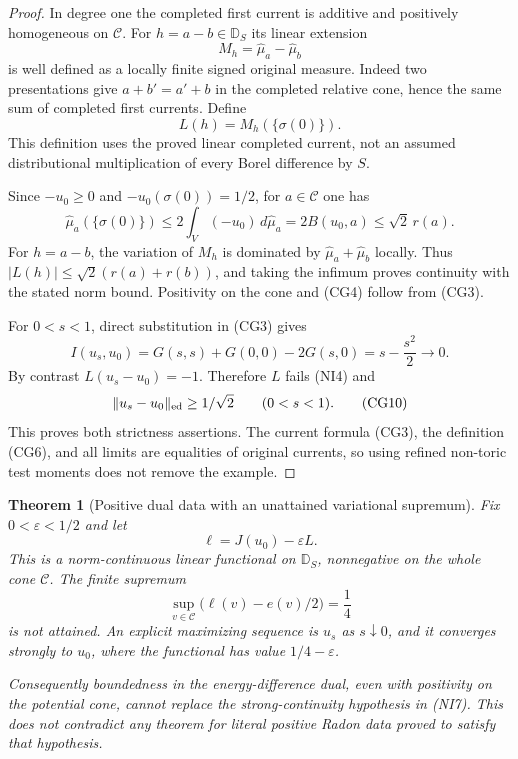 \documentclass[11pt,a4paper]{article}
\numberwithin{equation}{section}
\newtheorem{theorem}{Theorem}[section]
\theoremstyle{definition}
\theoremstyle{remark}
\begin{document}
\begin{proof}
In degree one the completed first current is additive and
positively homogeneous on $\mathscr C$. For $h=a-b\in\mathbb D_S$
its linear extension
\[
                    M_h=\widehat\mu_a-\widehat\mu_b
 \tag{CG6}
\]
is well defined as a locally finite signed original measure.
Indeed two presentations give $a+b'=a'+b$ in the completed
relative cone, hence the same sum of completed first currents.
Define
\[
                          L(h)=M_h(\{\sigma(0)\}).
 \tag{CG7}
\]
This definition uses the proved linear completed current, not
an assumed distributional multiplication of every Borel
difference by $S$.

Since $-u_0\geq0$ and $-u_0(\sigma(0))=1/2$, for $a\in\mathscr C$
one has
\[
 \widehat\mu_a(\{\sigma(0)\})
       \leq2\int_V(-u_0)\,d\widehat\mu_a
       =2B(u_0,a)
       \leq\sqrt2\,r(a).
 \tag{CG8}
\]
For $h=a-b$, the variation of $M_h$ is dominated by
$\widehat\mu_a+\widehat\mu_b$ locally. Thus
$|L(h)|\leq\sqrt2(r(a)+r(b))$, and taking the infimum proves
continuity with the stated norm bound. Positivity on the cone
and (CG4) follow from (CG3).

For $0<s<1$, direct substitution in (CG3) gives
\[
                 I(u_s,u_0)
       =G(s,s)+G(0,0)-2G(s,0)=s-\frac{s^2}{2}\longrightarrow0.
 \tag{CG9}
\]
By contrast $L(u_s-u_0)=-1$. Therefore $L$ fails (NI4) and
\[
                    \|u_s-u_0\|_{\rm ed}\geq1/\sqrt2
                    \qquad(0<s<1).
 \tag{CG10}
\]
This proves both strictness assertions. The current formula
(CG3), the definition (CG6), and all limits are equalities
of original currents, so using refined non-toric test moments
does not remove the example.
\end{proof}

\begin{theorem}[Positive dual data with an unattained variational supremum]
\label{thm:r12-dual-nonattainment}
Fix $0<\varepsilon<1/2$ and let
\[
                         \ell=J(u_0)-\varepsilon L.
 \tag{CG11}
\]
This is a norm-continuous linear functional on $\mathbb D_S$,
nonnegative on the whole cone $\mathscr C$. The finite supremum
\[
           \sup_{v\in\mathscr C}
                     \bigl(\ell(v)-e(v)/2\bigr)=\frac14
 \tag{CG12}
\]
is not attained. An explicit maximizing sequence is $u_s$ as
$s\downarrow0$, and it converges strongly to $u_0$, where the
functional has value $1/4-\varepsilon$.

Consequently boundedness in the energy-difference dual, even
with positivity on the potential cone, cannot replace the
strong-continuity hypothesis in (NI7). This does not contradict
any theorem for literal positive Radon data proved to satisfy
that hypothesis.
\end{theorem}
\end{document}
